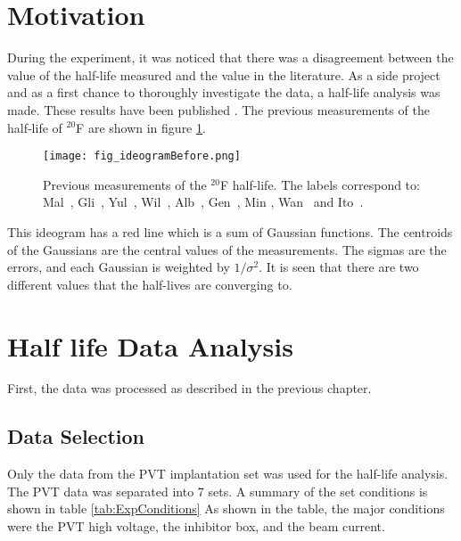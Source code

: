 \documentclass[MaxHughesThesis.tex]{subfiles}
\begin{document}
\section{Motivation}
During the experiment, it was noticed that there was a disagreement between the value of the half-life measured and the value in the literature.
As a side project and as a first chance to thoroughly investigate the data, a half-life analysis was made. 
These results have been published \cite{Hug18}. %
The previous measurements of the half-life of $^{20}$F are shown in figure \ref{fig:IDBefore}.

\begin{figure}[!htb]
	\centerline{\texttt{[image: fig\_ideogramBefore.png]}}
	\caption{Previous measurements of  the $^{20}$F half-life.
		 The labels correspond to: Mal~\cite{Mal62}, Gli~\cite{Gli63},
		Yul~\cite{Yul67}, Wil~\cite{Wil70}, Alb~\cite{Alb75}, Gen~\cite{Gen76},
		Min \cite{Min87}, Wan~\cite{Wan92} and Ito~\cite{Ito95}.}
	\label{fig:IDBefore}
\end{figure}

This ideogram has a red line which is a sum of Gaussian functions.
The centroids of the Gaussians are the central values of the measurements.
The sigmas are the errors, and each Gaussian is weighted by $1/\sigma^{2}$.
It is seen that there are two different values that the half-lives are converging to.


\section{Half life Data Analysis}
\label{sec:analysis}
First, the data was processed as described in the previous chapter.

\subsection{Data Selection}
Only the data from the PVT implantation set was used for the half-life analysis.
The PVT data was separated into 7 sets.
A summary of the set conditions is shown in table \ref{tab:ExpConditions}
As shown in the table, the major conditions were the PVT high voltage, the inhibitor box, and the beam current. 
\end{document}
